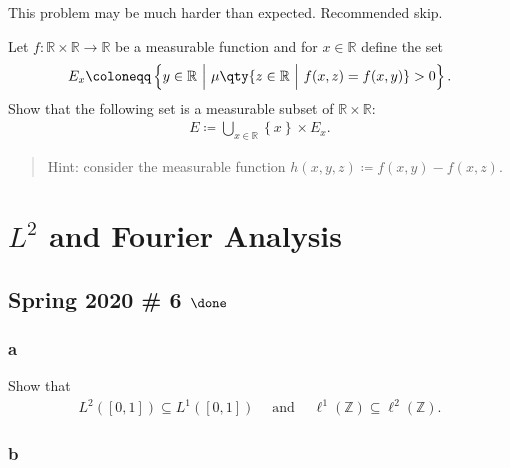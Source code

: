 \begin{warnings}

This problem may be much harder than expected. Recommended skip.

\end{warnings}

Let \(f: {\mathbb{R}}\times{\mathbb{R}}\to {\mathbb{R}}\) be a
measurable function and for \(x\in {\mathbb{R}}\) define the set
\begin{align*}
E_x \coloneqq\left\{{ y\in {\mathbb{R}}{~\mathrel{\Big|}~}\mu\qty{ z\in {\mathbb{R}}{~\mathrel{\Big|}~}f(x,z) = f(x, y) } > 0 }\right\} 
.\end{align*}
Show that the following set is a measurable subset of
\({\mathbb{R}}\times{\mathbb{R}}\):
\begin{align*}
E \coloneqq\bigcup_{x\in {\mathbb{R}}} \left\{{ x }\right\} \times E_x
.\end{align*}

\begin{quote}
Hint: consider the measurable function
\(h(x,y,z) \coloneqq f(x, y) - f(x, z)\).
\end{quote}

\hypertarget{l2-and-fourier-analysis}{%
\section{\texorpdfstring{\(L^2\) and Fourier
Analysis}{L\^{}2 and Fourier Analysis}}\label{l2-and-fourier-analysis}}

\hypertarget{spring-2020-6-done}{%
\subsection{\texorpdfstring{Spring 2020 \# 6
\(\done\)}{Spring 2020 \# 6 \textbackslash done}}\label{spring-2020-6-done}}

\hypertarget{a-11}{%
\subsubsection{a}\label{a-11}}

Show that
\begin{align*}
L^2([0, 1]) \subseteq L^1([0, 1]) {\quad \operatorname{and} \quad} \ell^1({\mathbb{Z}}) \subseteq \ell^2({\mathbb{Z}})
.\end{align*}

\hypertarget{b-11}{%
\subsubsection{b}\label{b-11}}

